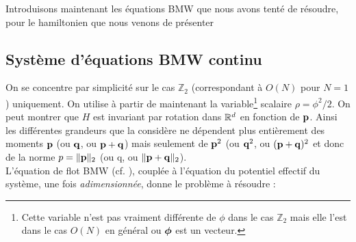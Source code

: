 \documentclass[10.5pt]{article}
\begin{document}
\begin{multicols*}{2}
Introduisons maintenant les équations BMW que nous avons tenté de résoudre, pour le hamiltonien que nous venons de présenter
\\



\subsection{Système d'équations BMW continu}


On se concentre par simplicité sur le cas  $\mathbb{Z}_2$ (correspondant à $O(N)$ pour $N=1$) uniquement. On utilise à partir de maintenant la variable\footnote{Cette variable n'est pas vraiment différente de $\phi$ dans le cas $\mathbb{Z}_2$ mais elle l'est dans le cas $O(N)$ en général ou $\boldsymbol{ \phi}$ est un vecteur.} scalaire $\rho = \phi^2/2$. On peut montrer que $H$ est invariant par rotation dans $\mathbb{R}^d$ en fonction de ${\bf p}$. Ainsi les différentes grandeurs que la considère ne dépendent plus entièrement des moments ${\bf p}$ (ou ${\bf q}$, ou ${\bf p}+{\bf q}$) mais seulement de ${\bf p}^2$ (ou ${\bf q}^2$, ou $({\bf p}+{\bf q})^2$ et donc de la norme $p = \| {\bf p} \|_{2}$ (ou q, ou $\|{\bf p}+{\bf q}\|_2$). \\

L'équation de flot BMW (cf. ), couplée à l'équation du potentiel effectif du système, une fois \textit{adimensionnée}, donne le problème à résoudre : \\


\end{multicols*}
\end{document}
